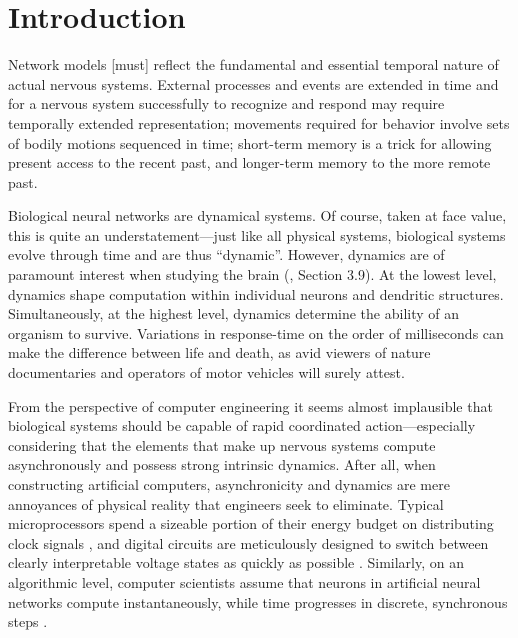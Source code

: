 \chapter{Introduction}
\label{chp:introduction}

\begin{OpeningQuote}
Network models [must] reflect the fundamental and
essential temporal nature of actual nervous systems. External processes and
events are extended in time and for a nervous system successfully to recognize
and respond may require temporally extended representation; movements required for behavior involve sets of bodily motions sequenced in time; short-term memory is a trick for allowing present access to the recent past, and
longer-term memory to the more remote past.
\end{OpeningQuote}


Biological neural networks are dynamical systems.
Of course, taken at face value, this is quite an understatement---just like all physical systems, biological systems evolve through time and are thus \enquote{dynamic}.
However, dynamics are of paramount interest when studying the brain (\cite{churchland1992computational}, Section 3.9).
At the lowest level, dynamics shape computation within individual neurons and dendritic structures.
Simultaneously, at the highest level, dynamics determine the ability of an organism to survive.
Variations in response-time on the order of milliseconds can make the difference between life and death, as avid viewers of nature documentaries and operators of motor vehicles will surely attest.

From the perspective of computer engineering it seems almost implausible that biological systems should be capable of rapid coordinated action---especially considering that the elements that make up nervous systems compute asynchronously and possess strong intrinsic dynamics.
After all, when constructing artificial computers, asynchronicity and dynamics are mere annoyances of physical reality that engineers seek to eliminate.
Typical microprocessors spend a sizeable portion of their energy budget on distributing clock signals \citep[e.g.,][]{zhang2008injectionlocked}, and digital circuits are meticulously designed to switch between clearly interpretable voltage states as quickly as possible \citep[e.g.,][Chapter~4]{weste2011cmos}.
Similarly, on an algorithmic level, computer scientists assume that neurons in artificial neural networks compute instantaneously, while time progresses in discrete, synchronous steps \citep[e.g.,][Chapter~10]{goodfellow2016deep}.

